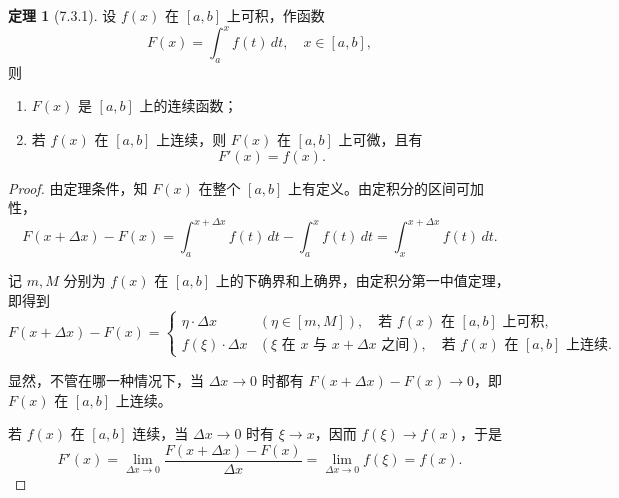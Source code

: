 \documentclass[12pt]{ctexart}
\theoremstyle{definition}
\newtheorem{theorem}{定理}[section]
\begin{document}
\begin{theorem}[7.3.1]
设 $f(x)$ 在 $[a,b]$ 上可积，作函数
\[
F(x) = \int_a^x f(t)\,dt, \quad x \in [a,b],
\]
则
\begin{enumerate}
    \item $F(x)$ 是 $[a,b]$ 上的连续函数；
    \item 若 $f(x)$ 在 $[a,b]$ 上连续，则 $F(x)$ 在 $[a,b]$ 上可微，且有
    \[
    F'(x) = f(x).
    \]
\end{enumerate}
\end{theorem}

\begin{proof}
由定理条件，知 $F(x)$ 在整个 $[a,b]$ 上有定义。由定积分的区间可加性，
\[
F(x+\Delta x) - F(x) = \int_a^{x+\Delta x} f(t)\,dt - \int_a^x f(t)\,dt = \int_x^{x+\Delta x} f(t)\,dt.
\]

记 $m, M$ 分别为 $f(x)$ 在 $[a,b]$ 上的下确界和上确界，由定积分第一中值定理，即得到
\[
F(x+\Delta x) - F(x) =
\begin{cases}
\eta \cdot \Delta x & (\eta \in [m,M]), \quad \text{若 } f(x) \text{ 在 } [a,b] \text{ 上可积}, \\
f(\xi) \cdot \Delta x & (\xi \text{ 在 } x \text{ 与 } x+\Delta x \text{ 之间}), \quad \text{若 } f(x) \text{ 在 } [a,b] \text{ 上连续}.
\end{cases}
\]

显然，不管在哪一种情况下，当 $\Delta x \to 0$ 时都有 $F(x+\Delta x) - F(x) \to 0$，即 $F(x)$ 在 $[a,b]$ 上连续。

若 $f(x)$ 在 $[a,b]$ 连续，当 $\Delta x \to 0$ 时有 $\xi \to x$，因而 $f(\xi) \to f(x)$，于是
\[
F'(x) = \lim_{\Delta x \to 0} \frac{F(x+\Delta x) - F(x)}{\Delta x} = \lim_{\Delta x \to 0} f(\xi) = f(x).
\]
\end{proof}
\end{document}

